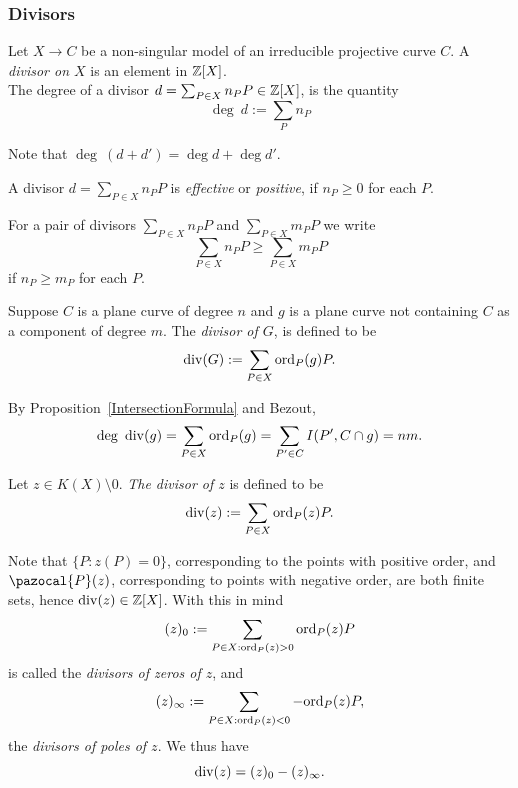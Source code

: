     \subsubsection{Divisors}
    \begin{definition}
        Let $X\rightarrow C$ be a non-singular model of an irreducible projective curve $C$. A \emph{divisor on $X$}
        is an element in $\mathbb{Z}[X]$.\\
        The degree of a divisor $d = \sum_{P\in X} n_P P\in \mathbb{Z}[X]$, is the quantity
        $$
            \deg \ d := \sum_{P} n_P
        $$
    \end{definition}
    \begin{remark}
        Note that $\deg\ (d+d') = \deg  d + \deg  d'$.
    \end{remark}
    \begin{definition}
        A divisor $d = \sum_{P\in X} n_P P $ is \emph{effective} or \emph{positive}, if $n_P\geq 0$ for each $P$. 
    \end{definition}
    \begin{definition}
        For a pair of divisors $\sum_{P\in X} n_P P$ and $\sum_{P\in X} m_P P$ we write 
        $$
            \sum_{P\in X} n_P P \geq \sum_{P\in X} m_P P
        $$
        if $n_P\geq m_P$ for each $P$. 
    \end{definition}
    \begin{definition}
        Suppose $C$ is a plane curve of degree $n$ and $g$ is a plane curve not containing $C$ as a component of degree $m$. The \emph{divisor of $G$}, is defined to be 
        $$\mathrm{div}(G) := \sum_{P\in X} \mathrm{ord}_P(g)P.$$  
    \end{definition}
    \begin{remark}
        By Proposition~\ref{IntersectionFormula} and Bezout,
        $$
            \deg \ \mathrm{div}(g) = \sum_{P\in X} \mathrm{ord}_P(g) = \sum_{P'\in C} I(P',C\cap g) = nm.
        $$
    \end{remark}
    \begin{definition}
        Let $z\in K(X)\setminus 0$. \emph{The divisor of $z$} is defined to be 
        $$
            \mathrm{div}(z) := \sum_{P\in X} \mathrm{ord}_P(z)P.
        $$
    \end{definition}
    \begin{remark}
        Note that $\{P : z(P) = 0\}$, corresponding to the points with positive order, and $\pazocal{P}(z)$, corresponding to points with negative order, are both finite sets, hence $\mathrm{div}(z)\in \mathbb{Z}[X]$. With this in mind 
        $$
            (z)_0 := \sum_{P\in X : \mathrm{ord}_P(z)>0} \mathrm{ord}_P(z)P
        $$
        is called the \emph{divisors of zeros of $z$}, and 
        $$
            (z)_\infty := \sum_{P\in X: \mathrm{ord}_P(z)<0} -\mathrm{ord}_P(z)P,
        $$
        the \emph{divisors of poles of $z$}. We thus have 
        $$
            \mathrm{div}(z) = (z)_0-(z)_\infty.
        $$
    \end{remark}
